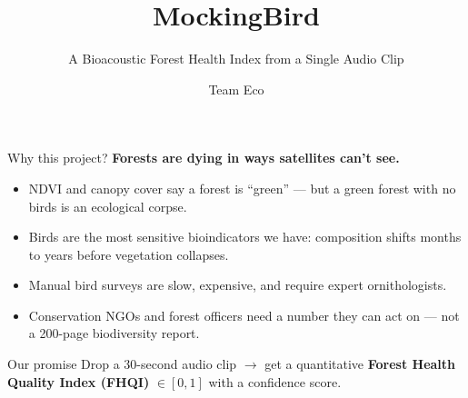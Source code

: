 \documentclass[aspectratio=169]{beamer}
\title{\textbf{MockingBird}}
\subtitle{A Bioacoustic Forest Health Index from a Single Audio Clip}
\author{Team Eco}
\institute{Hackathon 2026}
\date{}
\begin{document}
\maketitle

\begin{frame}{Why this project?}
  \textbf{Forests are dying in ways satellites can't see.}
  \begin{itemize}
    \item NDVI and canopy cover say a forest is ``green'' --- but a green forest with no birds is an ecological corpse.
    \item Birds are the most sensitive bioindicators we have: composition shifts \alert{months to years} before vegetation collapses.
    \item Manual bird surveys are slow, expensive, and require expert ornithologists.
    \item Conservation NGOs and forest officers need \alert{a number} they can act on --- not a 200-page biodiversity report.
  \end{itemize}
  \vspace{0.6em}
  \begin{alertblock}{Our promise}
    Drop a 30-second audio clip $\rightarrow$ get a quantitative \textbf{Forest Health Quality Index (FHQI)} $\in [0,1]$ with a confidence score.
  \end{alertblock}
\end{frame}
\end{document}
